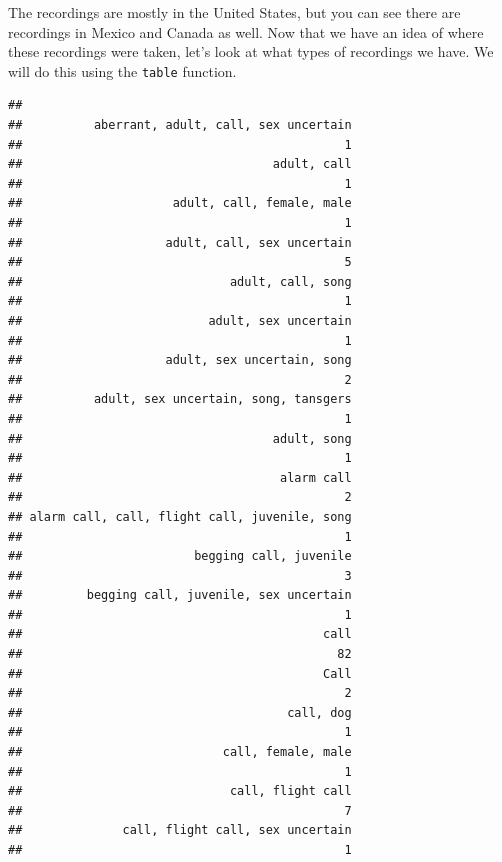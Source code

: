 \documentclass[
]{krantz}
\newenvironment{Shaded}{\begin{snugshade}}{\end{snugshade}}
\newcommand{\KeywordTok}[1]{\textcolor[rgb]{0.13,0.29,0.53}{\textbf{#1}}}
\newcommand{\NormalTok}[1]{#1}
\newcommand{\OperatorTok}[1]{\textcolor[rgb]{0.81,0.36,0.00}{\textbf{#1}}}
\begin{document}
The recordings are mostly in the United States, but you can see there are recordings in Mexico and Canada as well. Now that we have an idea of where these recordings were taken, let's look at what types of recordings we have. We will do this using the \texttt{table} function.

\begin{Shaded}
\end{Shaded}

\begin{verbatim}
## 
##          aberrant, adult, call, sex uncertain 
##                                             1 
##                                   adult, call 
##                                             1 
##                     adult, call, female, male 
##                                             1 
##                    adult, call, sex uncertain 
##                                             5 
##                             adult, call, song 
##                                             1 
##                          adult, sex uncertain 
##                                             1 
##                    adult, sex uncertain, song 
##                                             2 
##          adult, sex uncertain, song, tansgers 
##                                             1 
##                                   adult, song 
##                                             1 
##                                    alarm call 
##                                             2 
## alarm call, call, flight call, juvenile, song 
##                                             1 
##                        begging call, juvenile 
##                                             3 
##         begging call, juvenile, sex uncertain 
##                                             1 
##                                          call 
##                                            82 
##                                          Call 
##                                             2 
##                                     call, dog 
##                                             1 
##                            call, female, male 
##                                             1 
##                             call, flight call 
##                                             7 
##              call, flight call, sex uncertain 
##                                             1 

\end{verbatim}
\end{document}
